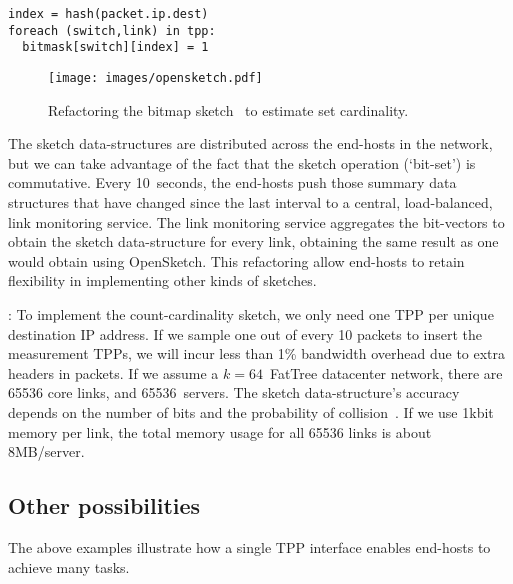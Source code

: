 \begin{eext}
\begin{verbatim}
index = hash(packet.ip.dest)
foreach (switch,link) in tpp:
  bitmask[switch][index] = 1
\end{verbatim}

\begin{figure}[t]
\centering
\texttt{[image: images/opensketch.pdf]}
\caption{Refactoring the bitmap sketch~\cite{estan2003bitmap} to estimate set cardinality.}
\label{fig:opensketch}
\end{figure}

The sketch data-structures are distributed across the end-hosts in the
network, but we can take advantage of the fact that the sketch
operation (`bit-set') is commutative.  Every 10~seconds, the end-hosts push
those summary data structures that have changed since the last
interval to a central, load-balanced, link monitoring service.  The
link monitoring service aggregates the bit-vectors to obtain the
sketch data-structure for every link, obtaining the same result as one
would obtain using OpenSketch.  This refactoring allow end-hosts to
retain flexibility in implementing other kinds of sketches.

: To implement the count-cardinality sketch, we
only need one TPP per unique destination IP address.  If we sample one
out of every 10 packets to insert the measurement TPPs, we will incur
less than 1\% bandwidth overhead due to extra headers in packets.  If
we assume a $k=64$~FatTree datacenter network, there are 65536 core
links, and 65536~servers.  The sketch data-structure's accuracy depends
on the number of bits and the probability of
collision~\cite{estan2003bitmap}.  If we use 1kbit memory per link,
the total memory usage for all 65536 links is about 8MB/server.
\end{eext}

\subsection{Other possibilities}\label{subsec:otherposs}
The above examples illustrate how a single TPP interface
enables end-hosts to achieve many tasks.  


